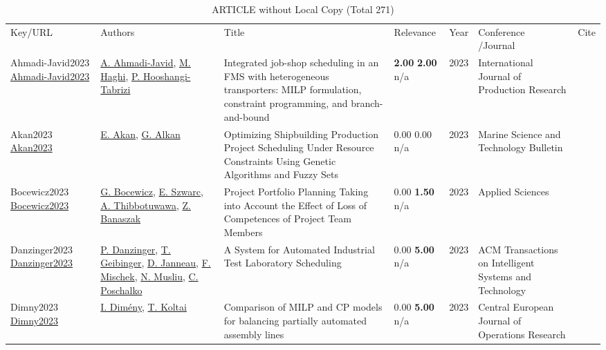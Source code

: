 {\scriptsize
\begin{longtable}{p{3cm}p{5cm}p{10cm}p{1cm}rp{2.5cm}l}
\rowcolor{white}\caption{ARTICLE without Local Copy (Total 271)}\\ \toprule
\rowcolor{white}Key/URL & Authors & Title & Relevance &Year & \shortstack{Conference\\/Journal} & Cite\\ \midrule
\endhead
\bottomrule
\endfoot
Ahmadi-Javid2023 \href{http://dx.doi.org/10.1080/00207543.2023.2230489}{Ahmadi-Javid2023} & \hyperref[auth:a1762]{A. Ahmadi-Javid}, \hyperref[auth:a1763]{M. Haghi}, \hyperref[auth:a1764]{P. Hooshangi-Tabrizi} & Integrated job-shop scheduling in an FMS with heterogeneous transporters: MILP formulation, constraint programming, and branch-and-bound & \noindent{}\textbf{2.00} \textbf{2.00} n/a & 2023 & \cellcolor{red!20}International Journal of Production Research & \cite{Ahmadi-Javid2023}\\
Akan2023 \href{http://dx.doi.org/10.33714/masteb.1324266}{Akan2023} & \hyperref[auth:a1751]{E. Akan}, \hyperref[auth:a1752]{G. Alkan} & Optimizing Shipbuilding Production Project Scheduling Under Resource Constraints Using Genetic Algorithms and Fuzzy Sets & \noindent{}\textcolor{black!50}{0.00} \textcolor{black!50}{0.00} n/a & 2023 & Marine Science and Technology Bulletin & \cite{Akan2023}\\
Bocewicz2023 \href{http://dx.doi.org/10.3390/app13127165}{Bocewicz2023} & \hyperref[auth:a630]{G. Bocewicz}, \hyperref[auth:a1997]{E. Szwarc}, \hyperref[auth:a2016]{A. Thibbotuwawa}, \hyperref[auth:a1814]{Z. Banaszak} & \cellcolor{gold!20}Project Portfolio Planning Taking into Account the Effect of Loss of Competences of Project Team Members & \noindent{}\textcolor{black!50}{0.00} \textbf{1.50} n/a & 2023 & Applied Sciences & \cite{Bocewicz2023}\\
Danzinger2023 \href{http://dx.doi.org/10.1145/3546871}{Danzinger2023} & \hyperref[auth:a1484]{P. Danzinger}, \hyperref[auth:a77]{T. Geibinger}, \hyperref[auth:a1485]{D. Janneau}, \hyperref[auth:a80]{F. Mischek}, \hyperref[auth:a45]{N. Musliu}, \hyperref[auth:a1486]{C. Poschalko} & A System for Automated Industrial Test Laboratory Scheduling & \noindent{}\textcolor{black!50}{0.00} \textbf{5.00} n/a & 2023 & ACM Transactions on Intelligent Systems and Technology & \cite{Danzinger2023}\\
Dimny2023 \href{http://dx.doi.org/10.1007/s10100-023-00885-x}{Dimny2023} & \hyperref[auth:a1487]{I. Dimény}, \hyperref[auth:a1488]{T. Koltai} & \cellcolor{gold!20}Comparison of MILP and CP models for balancing partially automated assembly lines & \noindent{}\textcolor{black!50}{0.00} \textbf{5.00} n/a & 2023 & Central European Journal of Operations Research & \cite{Dimny2023}\\

\end{longtable}}
